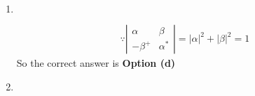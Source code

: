 \begin{enumerate}
\begin{answer}
\begin{align*}
	\text{	Let }b&=-2 a\\
	\left(\begin{array}{lll}0 & 0 & 1 \\ 0 & 1 & 0 \\ 1 & 0 & 0\end{array}\right)\left(\begin{array}{c}a \\ -2 a \\ a\end{array}\right)&=\left(\begin{array}{c}a \\ -2 a \\ a\end{array}\right)\text{ and }\left(\begin{array}{ccc}0 & 1 & 1 \\ 1 & 0 & 1 \\ 1 & 1 & 0\end{array}\right)\left(\begin{array}{c}a \\ -2 a \\ a\end{array}\right)=\left(\begin{array}{c}-a \\ 2 a \\ -a\end{array}\right)=-1\left(\begin{array}{c}a \\ -2 a \\ a\end{array}\right)
	\intertext{For other combination above relation is not possible.}
		\end{align*}
		So the correct answer is \textbf{Option (b)}
	\end{answer}
	\item $\left. \right. $		
\begin{answer}
	\begin{align*}
	\because\left|\begin{array}{cc}\alpha & \beta \\ -\beta^{+} & \alpha^{*}\end{array}\right|=|\alpha|^{2}+|\beta|^{2}=1
	\end{align*}
	So the correct answer is \textbf{Option (d)}
\end{answer}
	\item $\left. \right. $	
	\begin{answer}
		\begin{align*}

\end{align*}
\end{answer}
\end{enumerate}
